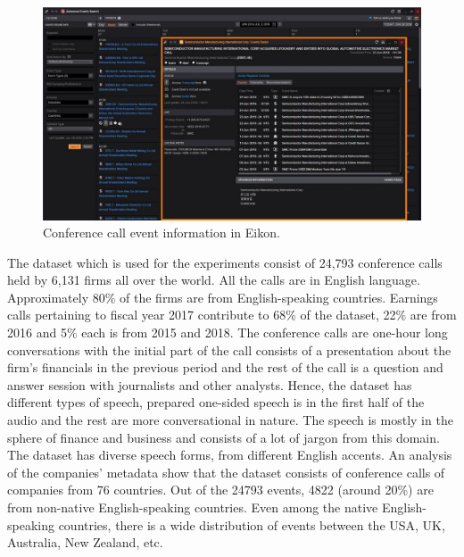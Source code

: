 \begin{figure}[ht]
  \begin{center}
    \includegraphics[width=\textwidth]{images/company-events-coverage-eikon.jpg} 
    \caption{Conference call event information in Eikon.}
    \label{fig:eikon}
  \end{center}
\end{figure}

The dataset which is used for the experiments consist of 24,793 conference calls held by 6,131 firms all over the world. All the calls are in English language. Approximately 80\% of the firms are from English-speaking countries. Earnings calls pertaining to fiscal year 2017 contribute to 68\% of the dataset, 22\% are from 2016 and 5\% each is from 2015 and 2018. 
The conference calls are one-hour long conversations with the initial part of the call consists of a presentation about the firm's financials in the previous period and the rest of the call is a question and answer session with journalists and other analysts. Hence, the dataset has different types of speech, prepared one-sided speech is in the first half of the audio and the rest are more conversational in nature. The speech is mostly in the sphere of finance and business and consists of a lot of jargon from this domain. The dataset has diverse speech forms, from different English accents. An analysis of the companies' metadata show that the dataset consists of conference calls of companies from 76 countries. Out of the 24793 events, 4822 (around 20\%) are from non-native English-speaking countries. Even among the native English-speaking countries, there is a wide distribution of events between the USA, UK, Australia, New Zealand, etc.

